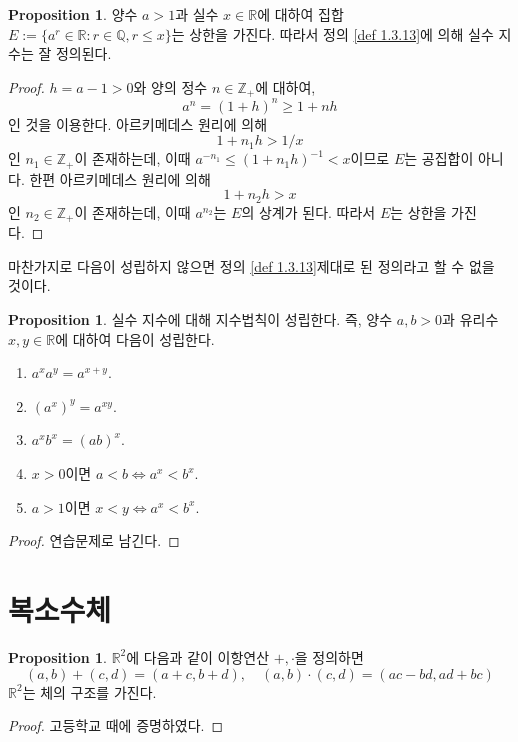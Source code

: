 \documentclass[11pt]{book}
\numberwithin{equation}{chapter}
\def\ZZ{\mathbb{Z}}
\def\QQ{\mathbb{Q}}
\def\RR{\mathbb{R}}
\theoremstyle{definition}
\newtheorem{prop}[thm]{Proposition}
\begin{document}
    \begin{prop}
        양수 \(a > 1\)과 실수 \(x \in \RR\)에 대하여 집합 \(E := \{a^r \in \RR : r \in \QQ, r \le x\}\)는 상한을 가진다. 따라서 정의 \ref{def 1.3.13}에 의해 실수 지수는 잘 정의된다.
    \end{prop}
    \begin{proof}
        \(h = a - 1 > 0\)와 양의 정수 \(n \in \ZZ_+\)에 대하여,
        \[
        a^n = (1+h)^n \ge 1 + nh    
        \]
        인 것을 이용한다. 아르키메데스 원리에 의해
        \[
        1 + n_1 h > 1/x    
        \]
        인 \(n_1 \in \ZZ_+\)이 존재하는데, 이때 \(a^{-n_1} \le (1 + n_1 h)^{-1} < x\)이므로 \(E\)는 공집합이 아니다. 한편 아르키메데스 원리에 의해
        \[
        1 + n_2 h > x    
        \]
        인 \(n_2 \in \ZZ_+\)이 존재하는데, 이때 \(a^{n_2}\)는 \(E\)의 상계가 된다. 따라서 \(E\)는 상한을 가진다.
    \end{proof}

마찬가지로 다음이 성립하지 않으면 정의 \ref{def 1.3.13}\이 제대로 된 정의라고 할 수 없을 것이다.

    \begin{prop}
        실수 지수에 대해 지수법칙이 성립한다. 즉, 양수 \(a, b > 0\)과 유리수 \(x, y \in \RR\)에 대하여 다음이 성립한다.
        \begin{enumerate}[label=(\alph*), leftmargin=2\parindent]
            \item \(a^x a^y = a^{x+y}\).
            \item \((a^x)^y = a^{xy}\).
            \item \(a^x b^x = (ab)^x\).
            \item \(x > 0\)이면 \(a < b \iff a^x < b^x\).
            \item \(a > 1\)이면 \(x < y \iff a^x < b^x\).
        \end{enumerate}
    \end{prop}
    \begin{proof}
        연습문제로 남긴다.
    \end{proof}


\section{복소수체}

    \begin{prop} \label{prop 1.4.1}
        \(\RR^2\)에 다음과 같이 이항연산 \(+, \cdot\)을 정의하면
        \[
        (a, b) + (c, d) = (a+c, b+d), \quad (a, b)\cdot(c, d) = (ac - bd, ad+bc)    
        \]
        \(\RR^2\)는 체의 구조를 가진다.
    \end{prop}
    \begin{proof}
        고등학교 때에 증명하였다.
    \end{proof}
\end{document}
